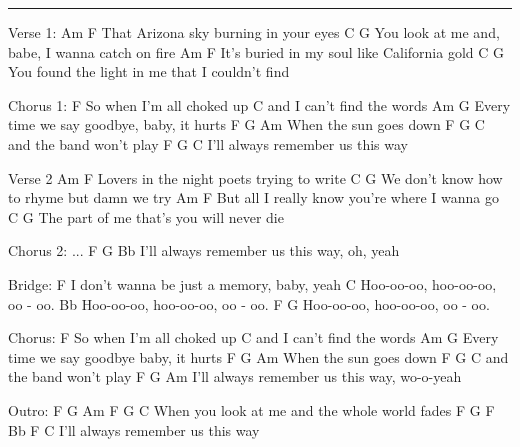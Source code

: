 \noindent\rule{\columnwidth}{1pt}

\begin{multicols}{2}
\begin{lstsong}
Verse 1:
             Am                  F
That Arizona sky burning in your eyes
    C                                      G
You look at me and, babe, I wanna catch on fire
                  Am                   F
It's buried in my soul like California gold
    C                                     G
You found the light in me that I couldn't find
 
Chorus 1:
            F
So when I'm all choked up
                     C
and I can't find the words
      Am                            G
Every time we say goodbye, baby, it hurts
          F   G    Am
When the sun goes down
        F    G     C
and the band won't play
     F       G               C
I'll always remember us this way
 
Verse 2
              Am                    F
Lovers in the night poets trying to write
    C                                   G
We don't know how to rhyme but damn we try
                 Am                         F
But all I really know you're where I wanna go
    C                                G
The part of me that's you will never die

Chorus 2:
...
     F        G              Bb
I'll always remember us this way, oh, yeah

Bridge:
F
I don't wanna be just a memory, baby, yeah
C
  Hoo-oo-oo, hoo-oo-oo, oo - oo.
Bb
  Hoo-oo-oo, hoo-oo-oo, oo - oo.
F                              G
  Hoo-oo-oo, hoo-oo-oo, oo - oo.
 
Chorus:
            F
So when I'm all choked up
                     C
and I can't find the words
      Am                           G
Every time we say goodbye baby, it hurts
          F   G    Am
When the sun goes down
        F    G     C
and the band won't play
     F       G          Am
I'll always remember us    this way, wo-o-yeah 
 
Outro:
         F    G  Am         F     G     C
When you look at me and the whole world fades
     F       G                     F Bb  F  C
I'll always remember us      this way
\end{lstsong}
\end{multicols}
\newpage

